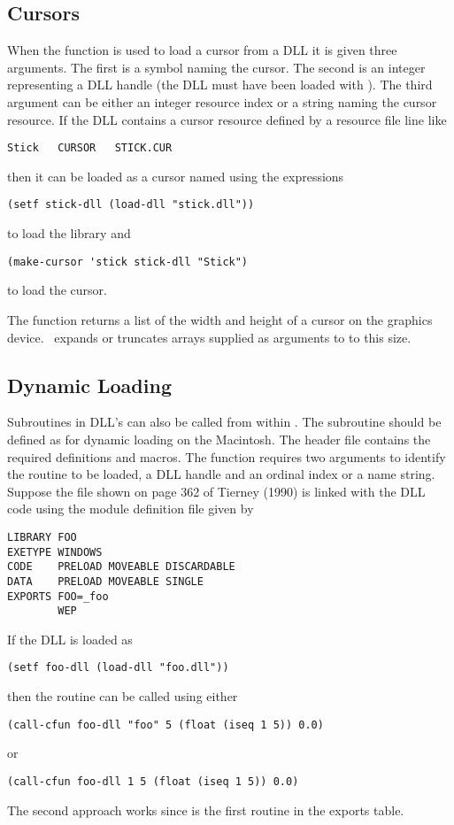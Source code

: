 \subsection{Cursors}
When the  function is used to load a cursor from a
DLL it is given three arguments. The first is a symbol naming the
cursor.  The second is an integer representing a DLL handle (the DLL
must have been loaded with ). The third argument can
be either an integer resource index or a string naming the cursor
resource. If the DLL  contains a cursor resource
defined by a resource file line like
\begin{verbatim}
Stick   CURSOR   STICK.CUR
\end{verbatim}
then it can be loaded as a cursor named  using the
expressions
\begin{verbatim}
(setf stick-dll (load-dll "stick.dll"))
\end{verbatim}
to load the library and
\begin{verbatim}
(make-cursor 'stick stick-dll "Stick")
\end{verbatim}
to load the cursor.

The function  returns a list of the width and
height of a cursor on the graphics device. \XLS\ expands or truncates
arrays supplied as arguments to  to this size.

\subsection*{Dynamic Loading}
Subroutines in DLL's can also be called from within \XLS.  The
subroutine should be defined as for dynamic loading on the Macintosh.
The header file  contains the required definitions and
macros.  The  function requires two arguments to
identify the routine to be loaded, a DLL handle and an ordinal index
or a name string.  Suppose the file  shown on page 362 of
Tierney (1990) is linked with the DLL code  using the
module definition file  given by
\begin{verbatim}
LIBRARY FOO
EXETYPE WINDOWS
CODE    PRELOAD MOVEABLE DISCARDABLE
DATA    PRELOAD MOVEABLE SINGLE
EXPORTS FOO=_foo
        WEP
\end{verbatim}
If the DLL is loaded as
\begin{verbatim}
(setf foo-dll (load-dll "foo.dll"))
\end{verbatim}
then the routine  can be called using either
\begin{verbatim}
(call-cfun foo-dll "foo" 5 (float (iseq 1 5)) 0.0)
\end{verbatim}
or
\begin{verbatim}
(call-cfun foo-dll 1 5 (float (iseq 1 5)) 0.0)
\end{verbatim}
The second approach works since  is the first routine in
the exports table.

